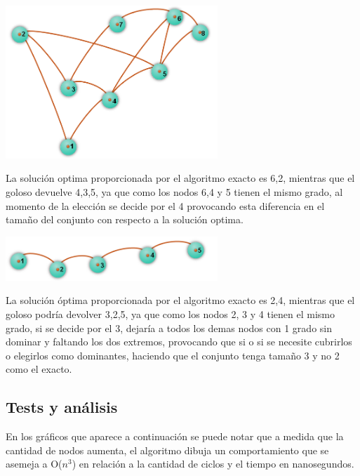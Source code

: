 \begin {center}
\includegraphics[width=8cm]{./graficos/grafo.png}
\end {center} 
La solución optima proporcionada por el algoritmo exacto es {6,2}, mientras que el goloso devuelve {4,3,5}, ya que como los nodos 6,4 y 5 tienen el mismo grado, al momento de la elección se decide por el 4 provocando esta diferencia en el tamaño del conjunto con respecto a la solución optima.

\begin {center}
\includegraphics[width=8cm]{./graficos/grafo_camino.png}
\end {center} 
La solución óptima proporcionada por el algoritmo exacto es {2,4}, mientras que el goloso podría devolver {3,2,5}, ya que como los nodos 2, 3 y 4 tienen el mismo grado, si se decide por el 3, dejaría a todos los demas nodos con 1 grado sin dominar y faltando los dos extremos, provocando que si o si se necesite cubrirlos o elegirlos como dominantes, haciendo que el conjunto tenga tamaño 3 y no 2 como el exacto.

\subsection{Tests y análisis}

En los gráficos que aparece a continuación  se puede notar que a medida que la cantidad de nodos aumenta, el algoritmo dibuja un comportamiento que se asemeja a O($n^3$) en relación a la cantidad de ciclos y el tiempo en nanosegundos.\\

